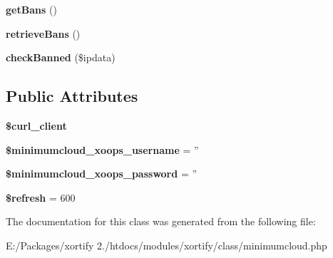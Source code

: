 \begin{DoxyCompactItemize}
\item 
\hypertarget{class_minimumcloud_xortify_exchange_a5246307afd025b45589d908c13a3e924}{{\bfseries get\-Bans} ()}\label{class_minimumcloud_xortify_exchange_a5246307afd025b45589d908c13a3e924}

\item 
\hypertarget{class_minimumcloud_xortify_exchange_a04a4e2d3d688861d870f45b76d5c78bc}{{\bfseries retrieve\-Bans} ()}\label{class_minimumcloud_xortify_exchange_a04a4e2d3d688861d870f45b76d5c78bc}

\item 
\hypertarget{class_minimumcloud_xortify_exchange_a4d1ab312c17a34bed16962dd4a697aec}{{\bfseries check\-Banned} (\$ipdata)}\label{class_minimumcloud_xortify_exchange_a4d1ab312c17a34bed16962dd4a697aec}

\end{DoxyCompactItemize}
\subsection*{Public Attributes}
\begin{DoxyCompactItemize}
\item 
\hypertarget{class_minimumcloud_xortify_exchange_a135683a265eb2392b131f21075be37db}{{\bfseries \$curl\-\_\-client}}\label{class_minimumcloud_xortify_exchange_a135683a265eb2392b131f21075be37db}

\item 
\hypertarget{class_minimumcloud_xortify_exchange_ad4cd260c2717aa6fb52976451707e1f4}{{\bfseries \$minimumcloud\-\_\-xoops\-\_\-username} = ''}\label{class_minimumcloud_xortify_exchange_ad4cd260c2717aa6fb52976451707e1f4}

\item 
\hypertarget{class_minimumcloud_xortify_exchange_acaf0e8669954065a25e32ff6c9cca796}{{\bfseries \$minimumcloud\-\_\-xoops\-\_\-password} = ''}\label{class_minimumcloud_xortify_exchange_acaf0e8669954065a25e32ff6c9cca796}

\item 
\hypertarget{class_minimumcloud_xortify_exchange_aec59bc066a59f3353ee3f39bdc4e0715}{{\bfseries \$refresh} = 600}\label{class_minimumcloud_xortify_exchange_aec59bc066a59f3353ee3f39bdc4e0715}

\end{DoxyCompactItemize}


The documentation for this class was generated from the following file\-:\begin{DoxyCompactItemize}
\item 
E\-:/\-Packages/xortify 2./htdocs/modules/xortify/class/minimumcloud.\-php\end{DoxyCompactItemize}
